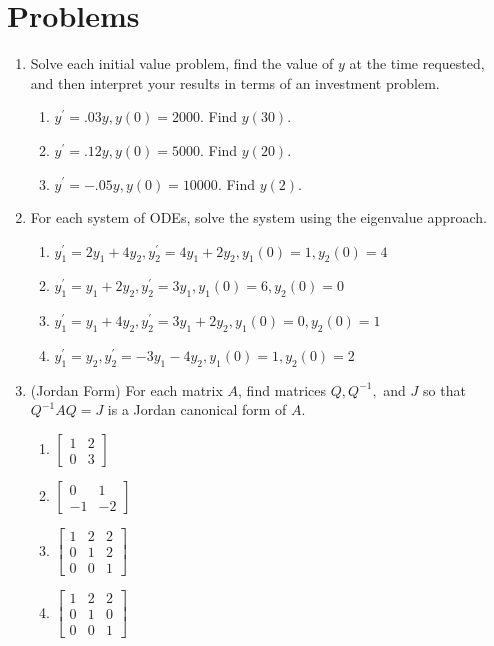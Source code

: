 

\section{Problems}


\begin{multicols}{2}

\begin{enumerate}

\item Solve each initial value problem, find the value of $y$ at the time requested, and then interpret your results in terms of an investment problem.
\begin{enumerate}
	\item $y^\prime = .03 y, y(0)=2000$. Find $y(30)$.
	\item $y^\prime = .12 y, y(0)=5000$. Find $y(20)$.
	\item $y^\prime = -.05 y, y(0)=10000$. Find $y(2)$.
\end{enumerate}
\item For each system of ODEs, solve the system using the eigenvalue approach.
\begin{enumerate}
\item $y_1^\prime = 2y_1+4y_2, y_2^\prime = 4y_1+2y_2 , y_1(0)=1, y_2(0) = 4$
\item $y_1^\prime = y_1+2y_2, y_2^\prime = 3y_1 , y_1(0)=6, y_2(0) = 0$
\item $y_1^\prime = y_1+4y_2, y_2^\prime = 3y_1+2y_2 , y_1(0)=0, y_2(0) = 1$
\item $y_1^\prime = y_2, y_2^\prime = -3y_1-4y_2 , y_1(0)=1, y_2(0) = 2$
\end{enumerate}

\item (Jordan Form) For each matrix $A$, find matrices $Q,Q^{-1},$ and $J$ so that $Q^{-1}AQ=J$ is a Jordan canonical form of $A$.
\begin{multicols}{2}
\begin{enumerate}
	\item $\begin{bmatrix}1&2\\0&3\end{bmatrix}$
	\item $\begin{bmatrix}0&1\\-1&-2\end{bmatrix}$
	\item $\begin{bmatrix}1&2&2\\0&1&2\\0&0&1 \end{bmatrix}$
	\item $\begin{bmatrix}1&2&2\\0&1&0\\0&0&1 \end{bmatrix}$
\end{enumerate}
\end{multicols}


\end{enumerate}
\end{multicols}
